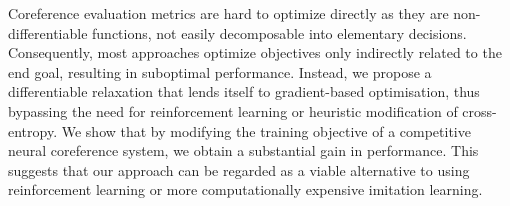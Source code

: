 Coreference evaluation metrics are hard to optimize directly as they are non-differentiable functions, not easily decomposable into elementary decisions. Consequently, most approaches optimize objectives only indirectly related to the end goal, resulting in suboptimal performance. Instead, we propose a differentiable relaxation that lends itself to gradient-based optimisation, thus bypassing the need for reinforcement learning or heuristic modification of cross-entropy. We show that by modifying the training objective of a competitive neural coreference system, we obtain a substantial gain in performance. This suggests that our approach can be regarded as a viable alternative to using reinforcement learning or more computationally expensive imitation learning.
